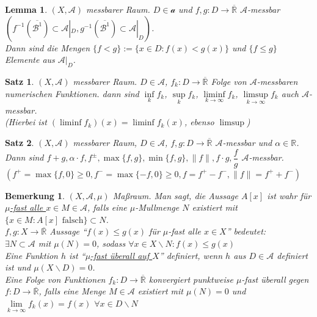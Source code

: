 \documentclass[11pt]{memoir}
\theoremstyle{changebreak}
\newtheorem{Bemerkung}{Bemerkung}[chapter]
\newtheorem{Lemma}{Lemma}[chapter]
\newtheorem{Satz}{Satz}[chapter]
\newcommand{\quotes}[1]{``#1''}
\begin{document}
\begin{Lemma}
$(X, \mathscr A)$ messbarer Raum. $D \in \mathscr a$ und $f, g: D \rightarrow \overline{\mathbb R }$ $\mathscr A$-messbar \\
$ \left( f^{-1}(\overline{\mathscr{B}^1}) \subset \mathscr A |_D, g^{-1}(\overline{\mathscr{B}^1}) \subset \mathscr A |_D\right)$. \\ Dann sind die Mengen $\{f < g\}:= \{x \in D: f(x) < g(x)\}$ und $\{f \leq g\}$ Elemente aus $\mathscr A |_D$.
\end{Lemma}

\begin{Satz}
$(X, \mathscr A)$ messbarer Raum. $D \in \mathscr A$, $f_k: D \rightarrow \overline{\mathbb R}$ Folge von $\mathscr A$-messbaren numerischen Funktionen. dann sind $\inf\limits_k f_k$, $\sup\limits_k f_k$, $\liminf\limits_{k\rightarrow \infty} f_k$, $\limsup\limits_{k \rightarrow \infty} f_k$ auch $\mathscr A$-messbar. \\
(Hierbei ist $(\liminf f_k)(x) = \liminf f_k(x)$, ebenso $\limsup$)
\end{Satz}

\begin{Satz}
$(X, \mathscr A)$ messbarer Raum, $D \in \mathscr A$, $f, g: D \rightarrow \overline{\mathbb R }$ $\mathscr A$-messbar und $\alpha \in \mathbb R$. Dann sind $f+g, \alpha \cdotp f, f^\pm, \max{\{f, g\}}, \min{\{f, g\}}, \|f\|, f \cdotp g, \dfrac{f}{g}$ $\mathscr A$-messbar. \\
$\left( f^+ = \max{\{f, 0\}} \geq 0, f^- = \max{\{-f, 0\}} \geq 0, f = f^+ - f^-, \|f\| = f^+ + f^- \right)$
\end{Satz}

\begin{Bemerkung}
$(X, \mathscr A, \mu)$ Maßraum. Man sagt, die Aussage $A[x]$ ist wahr für \underline{$\mu$-fast alle $x \in M \in \mathscr A$}, falls eine $\mu$-Mullmenge $N$ existiert mit $\{x \in M: A[x]  \text{ falsch}\} \subset N$.\\
$f, g: X \rightarrow \overline{\mathbb R}$ Aussage  \quotes{$f(x) \leq g(x)$ für $\mu$-fast alle $x \in X$}  bedeutet: \\
$\exists N \subset \mathscr A$ mit $\mu(N) = 0$, sodass $\forall x \in X\backslash N: f(x) \leq g(x)$ \\
Eine Funktion $h$ ist \quotes{\underline{$\mu$-fast überall auf $X$}} definiert, wenn $h$ aus $D \in \mathscr A$ definiert ist und $\mu(X \backslash D) = 0$. \\
Eine Folge von Funktionen $f_k: D \rightarrow \overline{\mathbb R}$ konvergiert punktweise $\mu$-fast überall gegen $f: D \rightarrow \overline{\mathbb R}$, falls eine Menge $M \in \mathscr A$ existiert mit $\mu(N) = 0$ und $\lim\limits_ {k \rightarrow \infty} f_k(x) = f(x)$ $\forall x \in D \backslash N$
\end{Bemerkung}
\end{document}
